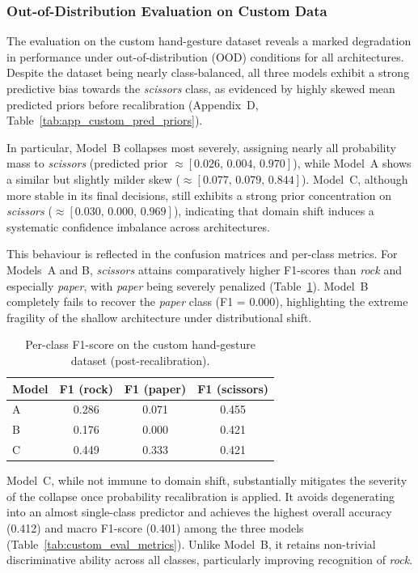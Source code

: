 \documentclass{article}
\begin{document}
\subsubsection{Out-of-Distribution Evaluation on Custom Data}

The evaluation on the custom hand-gesture dataset reveals a marked 
degradation in performance under out-of-distribution (OOD) conditions 
for all architectures. Despite the dataset being nearly class-balanced, 
all three models exhibit a strong predictive bias towards the 
\emph{scissors} class, as evidenced by highly skewed mean predicted 
priors before recalibration (Appendix~D, 
Table~\ref{tab:app_custom_pred_priors}). 

In particular, Model~B collapses most severely, assigning nearly all 
probability mass to \emph{scissors} 
(predicted prior $\approx [0.026,\, 0.004,\, 0.970]$), while Model~A 
shows a similar but slightly milder skew 
($\approx [0.077,\, 0.079,\, 0.844]$). 
Model~C, although more stable in its final decisions, still exhibits a 
strong prior concentration on \emph{scissors} 
($\approx [0.030,\, 0.000,\, 0.969]$), indicating that domain shift 
induces a systematic confidence imbalance across architectures.

This behaviour is reflected in the confusion matrices and per-class 
metrics. For Models~A and B, \emph{scissors} attains comparatively higher 
F1-scores than \emph{rock} and especially \emph{paper}, with 
\emph{paper} being severely penalized (Table~\ref{tab:custom_eval_f1_per_class}). 
Model~B completely fails to recover the \emph{paper} class (F1 = 0.000), 
highlighting the extreme fragility of the shallow architecture under 
distributional shift.

\begin{table}[h]
\centering
\caption{Per-class F1-score on the custom hand-gesture dataset (post-recalibration).}
\label{tab:custom_eval_f1_per_class}
\begin{tabular}{lccc}
\hline
Model & F1 (rock) & F1 (paper) & F1 (scissors) \\
\hline
A & 0.286 & 0.071 & 0.455 \\
B & 0.176 & 0.000 & 0.421 \\
C & 0.449 & 0.333 & 0.421 \\
\hline
\end{tabular}
\end{table}

Model~C, while not immune to domain shift, substantially mitigates the 
severity of the collapse once probability recalibration is applied. It avoids 
degenerating into an almost single-class predictor and achieves the 
highest overall accuracy (0.412) and macro F1-score (0.401) among the 
three models (Table~\ref{tab:custom_eval_metrics}). 
Unlike Model~B, it retains non-trivial discriminative ability across all 
classes, particularly improving recognition of \emph{rock}.
\end{document}
